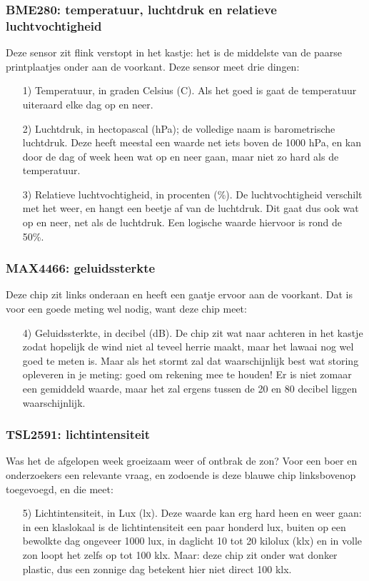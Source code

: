 \documentclass[a4paper,11pt, fleqn]{article}
\begin{document}
\subsubsection{BME280: temperatuur, luchtdruk en relatieve luchtvochtigheid}
Deze sensor zit flink verstopt in het kastje: het is de middelste van de paarse printplaatjes onder aan de voorkant. Deze sensor meet drie dingen:
\begin{itemize}
	\item[1)] Temperatuur, in graden Celsius (\textdegree C). Als het goed is gaat de temperatuur uiteraard elke dag op en neer.
	\item[2)] Luchtdruk, in hectopascal (hPa); de volledige naam is barometrische luchtdruk. Deze heeft meestal een waarde net iets boven de 1000 hPa, en kan door de dag of week heen wat op en neer gaan, maar niet zo hard als de temperatuur.
	\item[3)] Relatieve luchtvochtigheid, in procenten (\%). De luchtvochtigheid verschilt met het weer, en hangt een beetje af van de luchtdruk. Dit gaat dus ook wat op en neer, net als de luchtdruk. Een logische waarde hiervoor is rond de 50\%.
\end{itemize}

\subsubsection{MAX4466: geluidssterkte}
Deze chip zit links onderaan en heeft een gaatje ervoor aan de voorkant. Dat is voor een goede meting wel nodig, want deze chip meet:
\begin{itemize}
	\item[4)] Geluidssterkte, in decibel (dB). De chip zit wat naar achteren in het kastje zodat hopelijk de wind niet al teveel herrie maakt, maar het lawaai nog wel goed te meten is. Maar als het stormt zal dat waarschijnlijk best wat storing opleveren in je meting: goed om rekening mee te houden! Er is niet zomaar een gemiddeld waarde, maar het zal ergens tussen de 20 en 80 decibel liggen waarschijnlijk.
\end{itemize}

\subsubsection{TSL2591: lichtintensiteit}
Was het de afgelopen week groeizaam weer of ontbrak de zon? Voor een boer en onderzoekers een relevante vraag, en zodoende is deze blauwe chip linksbovenop toegevoegd, en die meet:
\begin{itemize}
	\item[5)] Lichtintensiteit, in Lux (lx). Deze waarde kan erg hard heen en weer gaan: in een klaslokaal is de lichtintensiteit een paar honderd lux, buiten op een bewolkte dag ongeveer 1000 lux, in daglicht 10 tot 20 kilolux (klx) en in volle zon loopt het zelfs op tot 100 klx. Maar: deze chip zit onder wat donker plastic, dus een zonnige dag betekent hier niet direct 100 klx.
\end{itemize}
\end{document}
